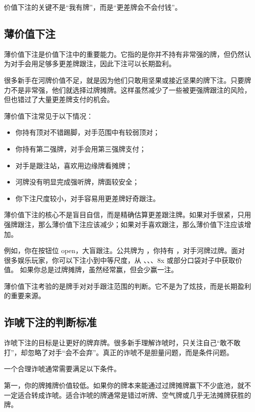 价值下注的关键不是“我有牌”，而是“更差牌会不会付钱”。

\subsection{薄价值下注}

薄价值下注是价值下注中的重要能力。它指的是你并不持有非常强的牌，但仍然认为对手会用足够多更差牌跟注，因此下注可以长期盈利。

很多新手在河牌价值不足，就是因为他们只敢用坚果或接近坚果的牌下注。只要牌力不是非常强，他们就选择过牌摊牌。这样虽然减少了一些被更强牌跟注的风险，但也错过了大量更差牌支付的机会。

薄价值下注常见于以下情况：

\begin{itemize}
\item 你持有顶对不错踢脚，对手范围中有较弱顶对；
\item 你持有第二强牌，对手会用第三强牌支付；
\item 对手是跟注站，喜欢用边缘牌看摊牌；
\item 河牌没有明显完成强听牌，牌面较安全；
\item 你下注尺度较小，对手容易用更差牌好奇跟注。
\end{itemize}

薄价值下注的核心不是盲目自信，而是精确估算更差跟注牌。如果对手很紧，只用强牌跟注，那么薄价值下注应该减少；如果对手喜欢跟注，那么薄价值下注应该增加。

例如，你在按钮位 open，大盲跟注。公共牌为 ，你持有 ，对手河牌过牌。面对很多娱乐玩家，你可以下注小到中等尺度，从 、、、8x 或部分口袋对子中获取价值。
如果你总是过牌摊牌，虽然经常赢，但会少赢一注。

薄价值下注考验的是牌手对对手跟注范围的判断。它不是为了炫技，而是长期盈利的重要来源。

\subsection{诈唬下注的判断标准}

诈唬下注的目标是让更好的牌弃牌。很多新手理解诈唬时，只关注自己“敢不敢打”，却忽略了对手“会不会弃”。真正的诈唬不是胆量问题，而是条件问题。

一个合理诈唬通常需要满足以下条件。

第一，你的牌摊牌价值较低。如果你的牌本来能通过过牌摊牌赢下不少底池，就不一定适合转成诈唬。适合诈唬的牌通常是错过听牌、空气牌或几乎无法摊牌获胜的牌。

